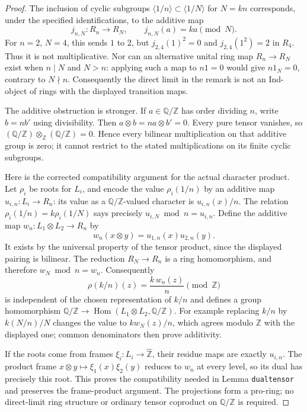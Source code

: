 \begin{proof}
The inclusion of cyclic subgroups
$\langle1/n\rangle\subset\langle1/N\rangle$ for $N=kn$
corresponds, under the specified identifications, to the additive map
\[
 j_{n,N}:R_n\longrightarrow R_N,\qquad
 j_{n,N}(a)=ka\pmod N.
\]
For $n=2$, $N=4$, this sends $1$ to $2$, but
$j_{2,4}(1)^2=0$ and $j_{2,4}(1^2)=2$ in $R_4$.
Thus it is not multiplicative.  Nor can an alternative unital ring
map $R_n\to R_N$ exist when $n\mid N$ and $N>n$: applying such a
map to $n1=0$ would give $n1_N=0$, contrary to $N\nmid n$.
Consequently the direct limit in the remark is not an Ind-object of
rings with the displayed transition maps.

The additive obstruction is stronger.  If $a\in\mathbb Q/\mathbb Z$
has order dividing $n$, write $b=nb'$ using divisibility.  Then
$a\otimes b=na\otimes b'=0$.  Every pure tensor vanishes, so
$(\mathbb Q/\mathbb Z)\otimes_{\mathbb Z}
(\mathbb Q/\mathbb Z)=0$.  Hence every bilinear multiplication on
that additive group is zero; it cannot restrict to the stated
multiplications on its finite cyclic subgroups.

Here is the corrected compatibility argument for the actual character
product.  Let $\rho_i$ be roots for $L_i$, and encode the value
$\rho_i(1/n)$ by an additive map
$u_{i,n}:L_i\to R_n$: its value as a $\mathbb Q/\mathbb Z$-valued
character is $u_{i,n}(x)/n$.  The relation
$\rho_i(1/n)=k\rho_i(1/N)$ says precisely
$u_{i,N}\bmod n=u_{i,n}$.
Define the additive map $w_n:L_1\otimes L_2\to R_n$ by
\[
 w_n(x\otimes y)=u_{1,n}(x)u_{2,n}(y).
\]
It exists by the universal property of the tensor product, since the
displayed pairing is bilinear.  The reduction $R_N\to R_n$ is a
ring homomorphism, and therefore $w_N\bmod n=w_n$.  Consequently
\[
 \rho(k/n)(z)=\frac{k\,w_n(z)}{n}\pmod{\mathbb Z}
\]
is independent of the chosen representation of $k/n$ and defines a
group homomorphism
$\mathbb Q/\mathbb Z\to
\operatorname{Hom}(L_1\otimes L_2,\mathbb Q/\mathbb Z)$.
For example replacing $k/n$ by $k(N/n)/N$ changes the value to
$k w_N(z)/n$, which agrees modulo $\mathbb Z$ with the displayed
one; common denominators then prove additivity.

If the roots come from frames
$\xi_i:L_i\to\widehat{\mathbb Z}$, their residue maps are exactly
$u_{i,n}$.  The product frame
$x\otimes y\mapsto\xi_1(x)\xi_2(y)$ reduces to $w_n$ at every
level, so its dual has precisely this root.  This proves the
compatibility needed in Lemma \texttt{dualtensor} and preserves the
frame-product argument.  The projections form a pro-ring; no
direct-limit ring structure or ordinary tensor coproduct on
$\mathbb Q/\mathbb Z$ is required.
\end{proof}

